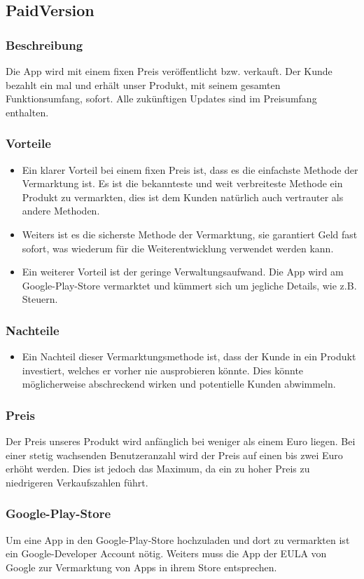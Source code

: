 \documentclass[FIPLY_base.tex]{subfiles}
\author{Gerald Irsiegler}
\date{25. Februar 2016}
\begin{document}
	
\subsection{PaidVersion}

\subsubsection{Beschreibung}
Die App wird mit einem fixen Preis veröffentlicht bzw. verkauft.
Der Kunde bezahlt ein mal und erhält unser Produkt, mit seinem gesamten Funktionsumfang, sofort.
Alle zukünftigen Updates sind im Preisumfang enthalten.

\subsubsection{Vorteile}
\begin{itemize}

\item Ein klarer Vorteil bei einem fixen Preis ist, dass es die einfachste Methode der Vermarktung ist.
Es ist die bekannteste und weit verbreiteste Methode ein Produkt zu vermarkten, dies ist dem Kunden natürlich auch vertrauter als andere Methoden.

\item Weiters ist es die sicherste Methode der Vermarktung, sie garantiert Geld fast sofort, was wiederum für die Weiterentwicklung verwendet werden kann.

\item Ein weiterer Vorteil ist der geringe Verwaltungsaufwand. Die App wird am Google-Play-Store vermarktet
und kümmert sich um jegliche Details, wie z.B. Steuern.

\end{itemize}

\subsubsection{Nachteile}
\begin{itemize}
\item Ein Nachteil dieser Vermarktungsmethode ist, dass der Kunde in ein Produkt investiert, welches er vorher nie ausprobieren könnte.
Dies könnte möglicherweise abschreckend wirken und potentielle Kunden abwimmeln.
\end{itemize}

\subsubsection{Preis}
Der Preis unseres Produkt wird anfänglich bei weniger als einem Euro liegen.
Bei einer stetig wachsenden Benutzeranzahl wird der Preis auf einen bis zwei Euro erhöht werden.
Dies ist jedoch das Maximum, da ein zu hoher Preis zu niedrigeren Verkaufszahlen führt.

\subsubsection{Google-Play-Store}
Um eine App in den Google-Play-Store hochzuladen und dort zu vermarkten ist ein Google-Developer Account nötig.
Weiters muss die App der EULA von Google zur Vermarktung von Apps in ihrem Store entsprechen.
\end{document}
